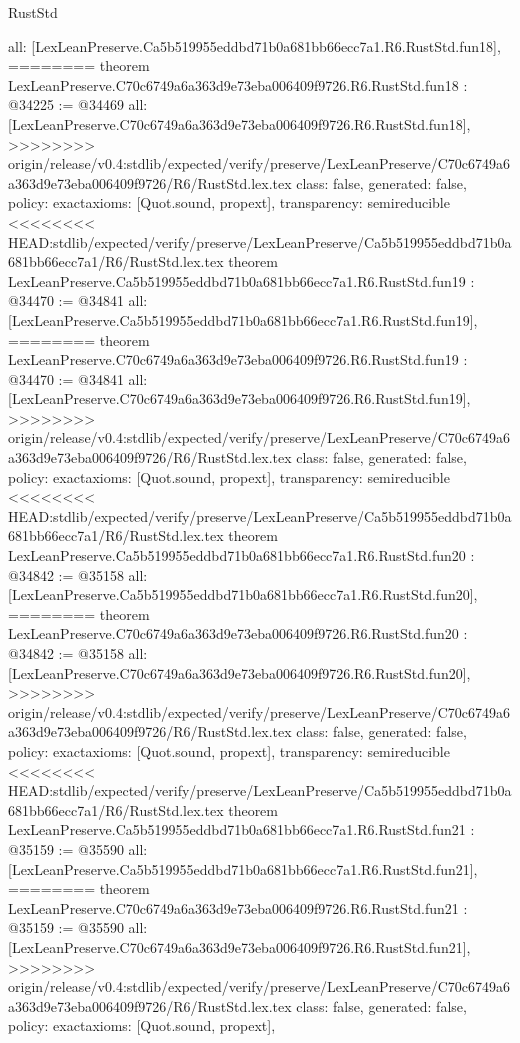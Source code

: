 \begin{lexlean}{RustStd}
\begin{coremodule}
{\begin{coremodule}
{{{{{{{{{{{{{{{{{{{{{  all: [LexLeanPreserve.Ca5b519955eddbd71b0a681bb66ecc7a1.R6.RustStd.fun18],
========
theorem LexLeanPreserve.C70c6749a6a363d9e73eba006409f9726.R6.RustStd.fun18 : @34225 := @34469 {
  all: [LexLeanPreserve.C70c6749a6a363d9e73eba006409f9726.R6.RustStd.fun18],
>>>>>>>> origin/release/v0.4:stdlib/expected/verify/preserve/LexLeanPreserve/C70c6749a6a363d9e73eba006409f9726/R6/RustStd.lex.tex
  class: false,
  generated: false,
  policy: exact{axioms: [Quot.sound, propext]},
  transparency: semireducible
}
<<<<<<<< HEAD:stdlib/expected/verify/preserve/LexLeanPreserve/Ca5b519955eddbd71b0a681bb66ecc7a1/R6/RustStd.lex.tex
theorem LexLeanPreserve.Ca5b519955eddbd71b0a681bb66ecc7a1.R6.RustStd.fun19 : @34470 := @34841 {
  all: [LexLeanPreserve.Ca5b519955eddbd71b0a681bb66ecc7a1.R6.RustStd.fun19],
========
theorem LexLeanPreserve.C70c6749a6a363d9e73eba006409f9726.R6.RustStd.fun19 : @34470 := @34841 {
  all: [LexLeanPreserve.C70c6749a6a363d9e73eba006409f9726.R6.RustStd.fun19],
>>>>>>>> origin/release/v0.4:stdlib/expected/verify/preserve/LexLeanPreserve/C70c6749a6a363d9e73eba006409f9726/R6/RustStd.lex.tex
  class: false,
  generated: false,
  policy: exact{axioms: [Quot.sound, propext]},
  transparency: semireducible
}
<<<<<<<< HEAD:stdlib/expected/verify/preserve/LexLeanPreserve/Ca5b519955eddbd71b0a681bb66ecc7a1/R6/RustStd.lex.tex
theorem LexLeanPreserve.Ca5b519955eddbd71b0a681bb66ecc7a1.R6.RustStd.fun20 : @34842 := @35158 {
  all: [LexLeanPreserve.Ca5b519955eddbd71b0a681bb66ecc7a1.R6.RustStd.fun20],
========
theorem LexLeanPreserve.C70c6749a6a363d9e73eba006409f9726.R6.RustStd.fun20 : @34842 := @35158 {
  all: [LexLeanPreserve.C70c6749a6a363d9e73eba006409f9726.R6.RustStd.fun20],
>>>>>>>> origin/release/v0.4:stdlib/expected/verify/preserve/LexLeanPreserve/C70c6749a6a363d9e73eba006409f9726/R6/RustStd.lex.tex
  class: false,
  generated: false,
  policy: exact{axioms: [Quot.sound, propext]},
  transparency: semireducible
}
<<<<<<<< HEAD:stdlib/expected/verify/preserve/LexLeanPreserve/Ca5b519955eddbd71b0a681bb66ecc7a1/R6/RustStd.lex.tex
theorem LexLeanPreserve.Ca5b519955eddbd71b0a681bb66ecc7a1.R6.RustStd.fun21 : @35159 := @35590 {
  all: [LexLeanPreserve.Ca5b519955eddbd71b0a681bb66ecc7a1.R6.RustStd.fun21],
========
theorem LexLeanPreserve.C70c6749a6a363d9e73eba006409f9726.R6.RustStd.fun21 : @35159 := @35590 {
  all: [LexLeanPreserve.C70c6749a6a363d9e73eba006409f9726.R6.RustStd.fun21],
>>>>>>>> origin/release/v0.4:stdlib/expected/verify/preserve/LexLeanPreserve/C70c6749a6a363d9e73eba006409f9726/R6/RustStd.lex.tex
  class: false,
  generated: false,
  policy: exact{axioms: [Quot.sound, propext]},
}}}}}}}}}}}}}}}}}}}}}}}}}
\end{coremodule}}
\end{coremodule}
\end{lexlean}
